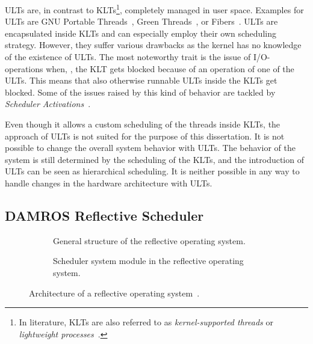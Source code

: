 \acp{ULT} are, in contrast to \acp{KLT}\footnote{In literature, \acp{KLT} are also referred to as \emph{kernel-supported threads} or \emph{lightweight processes}~\cite[184]{Stallings-2011-OperatingSystems}.}, completely managed in user space. Examples for \acp{ULT} are GNU Portable Threads~\cite{GNUPth}, Green Threads~\cite[Ch.~6]{Vanderburg-1996-GreenThreads}, or Fibers~\cite{Microsoft-2016-Fibers}. \acp{ULT} are encapsulated inside \acp{KLT} and can especially employ their own scheduling strategy. However, they suffer various drawbacks as the kernel has no knowledge of the existence of \acp{ULT}. The most noteworthy trait is the issue of I/O-operations when, \eg, the \ac{KLT} gets blocked because of an operation of one of the \acp{ULT}. This means that also otherwise runnable \acp{ULT} inside the \acp{KLT} get blocked. Some of the issues raised by this kind of behavior are tackled by \emph{Scheduler Activations}~\cite{Anderson-1992-SchedulerActivations}.

Even though it allows a custom scheduling of the threads inside \acp{KLT}, the approach of \acp{ULT} is not suited for the purpose of this dissertation. It is not possible to change the overall system behavior with \acp{ULT}. The behavior of the system is still determined by the scheduling of the \acp{KLT}, and the introduction of \acp{ULT} can be seen as hierarchical scheduling. It is neither possible in any way to handle changes in the hardware architecture with \acp{ULT}.

\subsection{DAMROS Reflective Scheduler}


\begin{figure}[b!]\centering\hfill
	\begin{subfigure}[b]{0.45\textwidth}\centering
		\vspace{1cm}
		\caption{General structure of the reflective operating system.}%
		\label{fig:related:damros:arch}
	\end{subfigure} \hfill\hfill
	\begin{subfigure}[b]{0.45\textwidth}\centering
		\caption{Scheduler system module in the reflective operating system.}%
		\label{fig:related:damros:sched}
	\end{subfigure}\hfill\hfill
	\caption[Architecture of a reflective operating system.]{Architecture of a reflective operating system~\cite{Patil-2005-DAMROS}.}%
	\label{fig:related:damros}
\end{figure}

